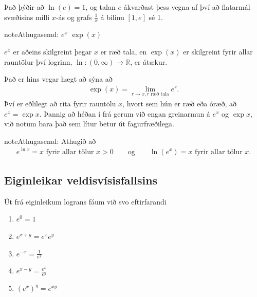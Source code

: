 \documentclass[b5paper,10pt,icelandic]{sphinxmanual}
\begin{document}
Það þýðir að \(\ln(e)=1\), og talan \(e\) ákvarðast þess vegna
af því að flatarmál svæðisins milli \(x\)-ás og grafs
\(\frac 1x\) á bilinu \([1,e]\) sé 1.


\begin{sphinxadmonition}{note}{Athugasemd:}
 \(e^x\)  \(\exp(x)\) 

\(e^x\) er aðeins skilgreint þegar \(x\) er ræð tala, en
\(\exp(x)\) er skilgreint fyrir allar rauntölur því logrinn,
\(\ln:(0,\infty)\to {{\mathbb  R}}\), er átækur.

Það er hins vegar hægt að sýna að
\begin{equation*}
\begin{split}\exp(x)=\lim_{r\to x, r\text{ ræð tala}} e^r.\end{split}
\end{equation*}
Því er eðlilegt að rita fyrir rauntölu \(x\), hvort sem hún er ræð
eða óræð, að \(e^x=\exp x\). Þannig að héðan í frá gerum við engan
greinarmun á \(e^x\) og \(\exp x\), við notum bara það sem lítur
betur út fagurfræðilega.
\end{sphinxadmonition}

\begin{sphinxadmonition}{note}{Athugasemd:}
Athugið að
\begin{equation*}
\begin{split}e^{\ln x}=x \mbox{ fyrir allar tölur }x>0\qquad \mbox{og}
\qquad \ln(e^x)=x  \mbox{ fyrir allar tölur }x.\end{split}
\end{equation*}\end{sphinxadmonition}


\subsection{Eiginleikar veldisvísisfallsins}
\label{\detokenize{kafli04:eiginleikar-veldisvisisfallsins}}
Út frá eiginleikum lograns fáum við svo eftirfarandi
\begin{enumerate}
\item {} 
\(e^0=1\)

\item {} 
\(e^{x+y}=e^x e^y\)

\item {} 
\(e^{-x}=\frac{1}{e^x}\)

\item {} 
\(e^{x-y}=\frac{e^x}{e^y}\)

\item {} 
\(\left(e^x\right)^y=e^{xy}\)

\end{enumerate}
\end{document}
